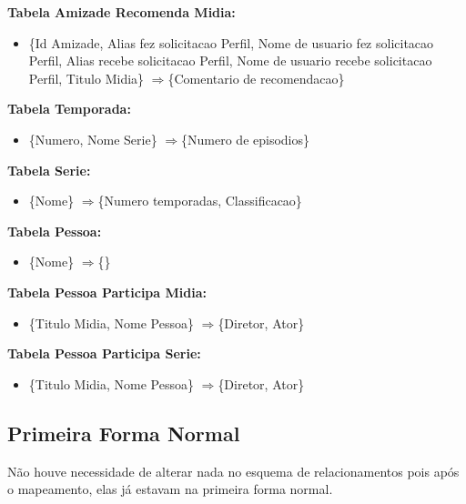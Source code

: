 \documentclass[12pt,a4paper]{article}
\newcommand{\rarrow}{$\Longrightarrow$}
\begin{document}
    {\bf Tabela Amizade Recomenda Midia: }
    \begin{itemize}
        \item \{Id Amizade, Alias fez solicitacao Perfil, Nome de usuario fez solicitacao Perfil, Alias recebe solicitacao Perfil, Nome de usuario recebe solicitacao Perfil, Titulo Midia\} \rarrow \{Comentario de recomendacao\} \\
    \end{itemize}
    
    {\bf Tabela Temporada: }
    \begin{itemize}
        \item \{Numero, Nome Serie\} \rarrow \{Numero de episodios\} \\
    \end{itemize}
    
    {\bf Tabela Serie: }
    \begin{itemize}
        \item \{Nome\} \rarrow \{Numero temporadas, Classificacao\} \\
    \end{itemize}
    
    {\bf Tabela Pessoa: }
    \begin{itemize}
        \item \{Nome\} \rarrow \{\} \\
    \end{itemize}
    
    {\bf Tabela Pessoa Participa Midia: }
    \begin{itemize}
        \item \{Titulo Midia, Nome Pessoa\} \rarrow \{Diretor, Ator\} \\
    \end{itemize}
    
    {\bf Tabela Pessoa Participa Serie: }
    \begin{itemize}
        \item \{Titulo Midia, Nome Pessoa\} \rarrow \{Diretor, Ator\} \\
    \end{itemize}

\subsection{Primeira Forma Normal}

    Não houve necessidade de alterar nada no esquema de relacionamentos pois após o mapeamento, elas já estavam na primeira forma normal.
    
\end{document}
